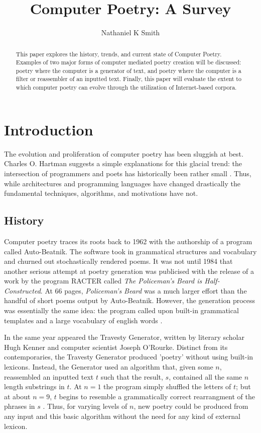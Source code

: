 \documentclass[10pt]{article}
\title{Computer Poetry: A Survey}
\author{Nathaniel K Smith}
\begin{document}
\maketitle

\begin{abstract}
This paper explores the history, trends, and current state of Computer Poetry.
Examples of two major forms of computer mediated poetry creation will be
discussed: poetry where the computer is a generator of text, and poetry where
the computer is a filter or reassembler of an inputted text. Finally, this
paper will evaluate the extent to which computer poetry can evolve through the
utilization of Internet-based corpora.
\end{abstract}

\section{Introduction} 
The evolution and proliferation of computer poetry has been sluggish at best.
Charles O. Hartman suggests a simple explanations for this glacial trend: the
intersection of programmers and poets has historically been rather small
\cite{Hart96}. Thus, while architectures and programming languages have changed
drastically the fundamental techniques, algorithms, and motivations have not.

\subsection{History} 
Computer poetry traces its roots back to 1962 with the authorship of a program
called Auto-Beatnik. The software took in grammatical structures and vocabulary
and churned out stochastically rendered poems. It was not until 1984 that
another serious attempt at poetry generation was publicised with the release of
a work by the program RACTER called \emph{The Policeman's Beard is Half-
Constructed}. At 66 pages, \emph{Policeman's Beard} was a much larger effort
than the handful of short poems output by Auto-Beatnik. However, the generation
process was essentially the same idea: the program called upon built-in grammatical
templates and a large vocabulary of english words \cite{Chamb84}. 

In the same year appeared the Travesty Generator, written by literary scholar
Hugh Kenner and computer scientist Joseph O'Rourke. Distinct from its
contemporaries, the Travesty Generator produced 'poetry' without using built-in
lexicons. Instead, the Generator used an algorithm that, given some $n$,
reassembled an inputted text $t$ such that the result, $s$, contained all the
same $n$ length substrings in $t$. At $n = 1$ the program simply shuffled the
letters of $t$; but at about $n = 9$, $t$ begins to resemble a grammatically
correct rearrangment of the phrases in $s$ \cite{Hart96}. Thus, for varying
levels of $n$, new poetry could be produced from any input and this basic
algorithm without the need for any kind of external lexicon.
\end{document}

